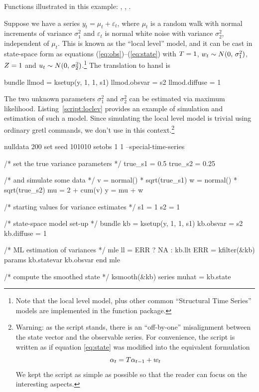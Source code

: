 Functions illustrated in this example: , ,
.

Suppose we have a series $y_t = \mu_t + \varepsilon_t$, where $\mu_t$
is a random walk with normal increments of variance $\sigma^2_1$ and
$\varepsilon_t$ is normal white noise with variance $\sigma^2_2$,
independent of $\mu_t$. This is known as the ``local level'' model,
and it can be cast in state-space form as equations
(\ref{eq:obs})--(\ref{eq:state}) with $T = 1$, $w_t \sim
N(0,\, \sigma^2_1)$, $Z = 1$ and $u_t \sim N(0,\,
\sigma^2_2)$.\footnote{Note that the local level model, plus other
  common ``Structural Time Series'' models are implemented in the
   function package.} The translation to \textsf{hansl}
is
\begin{code}
bundle llmod = ksetup(y, 1, 1, s1)
llmod.obsvar = s2
llmod.diffuse = 1
\end{code}

The two unknown parameters $\sigma^2_1$ and $\sigma^2_2$ can be
estimated via maximum likelihood.  Listing~\ref{script:loclev} provides
an example of simulation and estimation of such a model. Since
simulating the local level model is trivial using ordinary gretl
commands, we don't use  in this context.\footnote{Warning:
  as the script stands, there is an ``off-by-one'' misalignment
  between the state vector and the observable series. For convenience,
  the script is written as if equation \eqref{eq:state} was modified
  into the equivalent formulation
  \[
  \alpha_{t} = T \alpha_{t-1} + w_t
  \]
  We kept the script as simple as possible so that the reader can
  focus on the interesting aspects.}

\begin{script}[htbp]
  \label{script:loclev}
\begin{scode}
nulldata 200
set seed 101010
setobs 1 1 --special-time-series

/* set the true variance parameters */
true_s1 = 0.5
true_s2 = 0.25

/* and simulate some data */
v = normal() * sqrt(true_s1)
w = normal() * sqrt(true_s2)
mu = 2 + cum(v)
y = mu + w

/* starting values for variance estimates */
s1 = 1
s2 = 1

/* state-space model set-up */
bundle kb = ksetup(y, 1, 1, s1)
kb.obsvar = s2
kb.diffuse = 1

/* ML estimation of variances */
mle ll = ERR ? NA : kb.llt
    ERR = kfilter(&kb)
    params kb.statevar kb.obsvar
end mle

/* compute the smoothed state */
ksmooth(&kb)
series muhat = kb.state
\end{scode}
\end{script}

